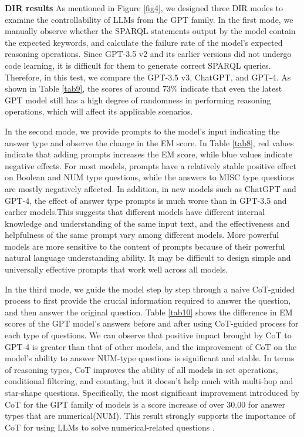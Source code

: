 \documentclass[runningheads]{llncs}
\begin{document}
\textbf{DIR results}
As mentioned in Figure \ref{fig4}, we designed three DIR modes to examine the controllability of LLMs from the GPT family. 
In the first mode, we manually observe whether the SPARQL statements output by the model contain the expected keywords, and calculate the failure rate of the model's expected reasoning operations. Since GPT-3.5 v2 and its earlier versions did not undergo code learning, it is difficult for them to generate correct SPARQL queries. Therefore, in this test, we compare the GPT-3.5 v3, ChatGPT, and GPT-4. 
As shown in Table \ref{tab9}, the scores of around 73\% indicate that even the latest GPT model still has a high degree of randomness in performing reasoning operations, which will affect its applicable scenarios.

In the second mode, we provide prompts to the model's input indicating the answer type and observe the change in the EM score. In Table \ref{tab8}, red values indicate that adding prompts increases the EM score, while blue values indicate negative effects. For most models, prompts have a relatively stable positive effect on Boolean and NUM type questions, while the answers to MISC type questions are mostly negatively affected. In addition, in new models such as ChatGPT and GPT-4, the effect of answer type prompts is much worse than in GPT-3.5 and earlier models.This suggests that different models have different internal knowledge and understanding of the same input text, and the effectiveness and helpfulness of the same prompt vary among different models. More powerful models are more sensitive to the content of prompts because of their powerful natural language understanding ability. It may be difficult to design simple and universally effective prompts that work well across all models.

In the third mode, we guide the model step by step through a naive CoT-guided process to first provide the crucial information required to answer the question, and then answer the original question. Table \ref{tab10} shows the difference in EM scores of the GPT model's answers before and after using CoT-guided process for each type of questions. 
We can observe that positive impact brought by CoT to GPT-4 is greater than that of other models, and the improvement of CoT on the model's ability to answer NUM-type questions is significant and stable. In terms of reasoning types, CoT improves the ability of all models in set operations, conditional filtering, and counting, but it doesn't help much with multi-hop and star-shape questions. Specifically, the most significant improvement introduced by CoT for the GPT family of models is a score increase of over 30.00 for answer types that are numerical(NUM). This result strongly supports the importance of CoT for using LLMs to solve numerical-related questions \cite{kojima2022large}.
\end{document}
